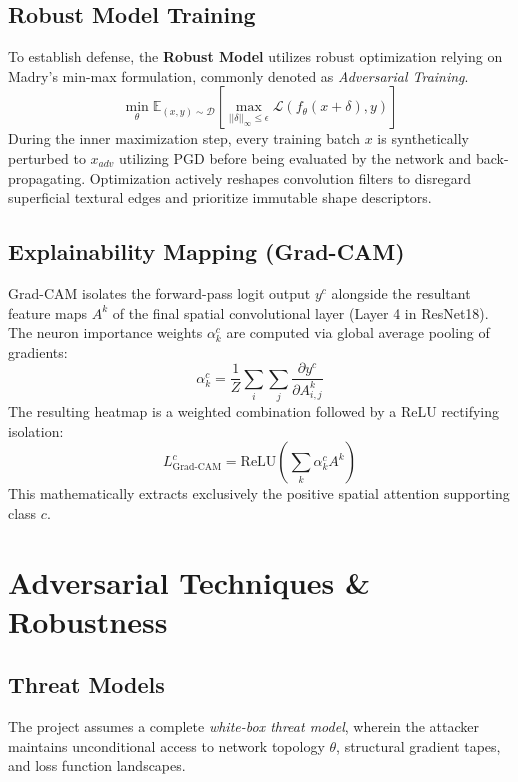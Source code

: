 \documentclass[12pt,a4paper]{article}
\begin{document}
\subsection{Robust Model Training}
To establish defense, the \textbf{Robust Model} utilizes robust optimization relying on Madry's min-max formulation, commonly denoted as \textit{Adversarial Training}.
\begin{equation}
    \min_{\theta} \mathbb{E}_{(x,y) \sim \mathcal{D}} \left[ \max_{||\delta||_\infty \leq \epsilon} \mathcal{L}(f_\theta(x+\delta), y) \right]
\end{equation}
During the inner maximization step, every training batch $x$ is synthetically perturbed to $x_{adv}$ utilizing PGD before being evaluated by the network and back-propagating. Optimization actively reshapes convolution filters to disregard superficial textural edges and prioritize immutable shape descriptors.

\subsection{Explainability Mapping (Grad-CAM)}
Grad-CAM isolates the forward-pass logit output $y^c$ alongside the resultant feature maps $A^k$ of the final spatial convolutional layer (Layer 4 in ResNet18). The neuron importance weights $\alpha_k^c$ are computed via global average pooling of gradients:
\begin{equation}
    \alpha_k^c = \frac{1}{Z} \sum_i \sum_j \frac{\partial y^c}{\partial A_{i,j}^k}
\end{equation}
The resulting heatmap is a weighted combination followed by a ReLU rectifying isolation:
\begin{equation}
    L^c_{\text{Grad-CAM}} = \text{ReLU} \left( \sum_k \alpha_k^c A^k \right)
\end{equation}
This mathematically extracts exclusively the positive spatial attention supporting class $c$.

\section{Adversarial Techniques \& Robustness}

\subsection{Threat Models}
The project assumes a complete \textit{white-box threat model}, wherein the attacker maintains unconditional access to network topology $\theta$, structural gradient tapes, and loss function landscapes.
\end{document}
